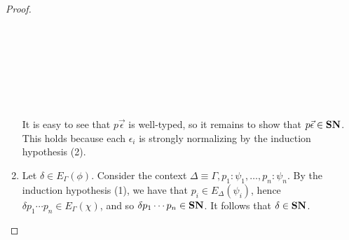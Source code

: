 \begin{proof}
\begin{enumerate}
\begin{code}
\>[0]\<[4]%
\>[4]       \AgdaSymbol{)}  \<%
\\
\>[4]\<[6]%
\>[6] \AgdaSymbol{(} \AgdaSymbol{(} \AgdaSymbol{)} \AgdaSymbol{)} \<%
\\
\>[0]\<[4]%
\>[4]  \<%
\\
\>[4]\<[6]%
\>[6] \AgdaSymbol{(} \AgdaSymbol{)} \AgdaSymbol{(}  \AgdaSymbol{)}\<%
\\
\>[0]\<[4]%
\>[4]\AgdaSymbol{)} \<[7]%
\>[7]\<%
\\
\>[0]\<[4]%
\>[4]\AgdaSymbol{)))}\<%
\\
\>\<%
\end{code}
It is easy to see that $p \vec{\epsilon}$ is well-typed, so it remains to show that $p \vec{\epsilon} \in \mathbf{SN}$.
This holds because each $\epsilon_i$ is strongly normalizing by the induction hypothesis (2).
\item
Let $\delta \in E_\Gamma(\phi)$.  Consider the context $\Delta \equiv \Gamma, p_1 : \psi_1, \ldots, p_n : \psi_n$.
By the induction hypothesis (1), we have that $p_i \in E_\Delta(\psi_i)$, hence
$\delta p_1 \cdots p_n \in E_\Gamma(\chi)$, and so $\delta p_1 \cdots p_n \in \mathbf{SN}$.
It follows that $\delta \in \mathbf{SN}$.
\end{enumerate}
\end{proof}
